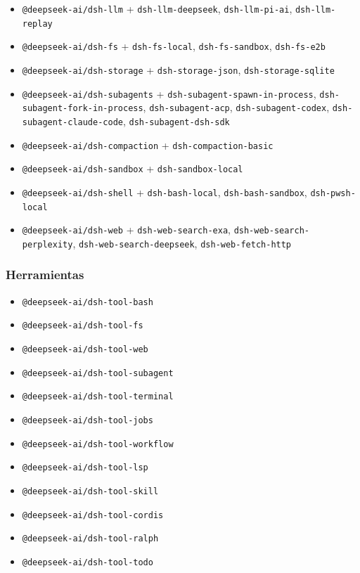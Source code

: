 \documentclass[11pt,a4paper]{article}
\begin{document}
\begin{itemize}[leftmargin=*,topsep=2pt,itemsep=1pt]
  \item \texttt{@deepseek-ai/dsh-llm} + \texttt{dsh-llm-deepseek}, \texttt{dsh-llm-pi-ai}, \texttt{dsh-llm-replay}
  \item \texttt{@deepseek-ai/dsh-fs} + \texttt{dsh-fs-local}, \texttt{dsh-fs-sandbox}, \texttt{dsh-fs-e2b}
  \item \texttt{@deepseek-ai/dsh-storage} + \texttt{dsh-storage-json}, \texttt{dsh-storage-sqlite}
  \item \texttt{@deepseek-ai/dsh-subagents} + \texttt{dsh-subagent-spawn-in-process}, \texttt{dsh-subagent-fork-in-process}, \texttt{dsh-subagent-acp}, \texttt{dsh-subagent-codex}, \texttt{dsh-subagent-claude-code}, \texttt{dsh-subagent-dsh-sdk}
  \item \texttt{@deepseek-ai/dsh-compaction} + \texttt{dsh-compaction-basic}
  \item \texttt{@deepseek-ai/dsh-sandbox} + \texttt{dsh-sandbox-local}
  \item \texttt{@deepseek-ai/dsh-shell} + \texttt{dsh-bash-local}, \texttt{dsh-bash-sandbox}, \texttt{dsh-pwsh-local}
  \item \texttt{@deepseek-ai/dsh-web} + \texttt{dsh-web-search-exa}, \texttt{dsh-web-search-perplexity}, \texttt{dsh-web-search-deepseek}, \texttt{dsh-web-fetch-http}
\end{itemize}


\subsubsection*{Herramientas}


\begin{itemize}[leftmargin=*,topsep=2pt,itemsep=1pt]
  \item \texttt{@deepseek-ai/dsh-tool-bash}
  \item \texttt{@deepseek-ai/dsh-tool-fs}
  \item \texttt{@deepseek-ai/dsh-tool-web}
  \item \texttt{@deepseek-ai/dsh-tool-subagent}
  \item \texttt{@deepseek-ai/dsh-tool-terminal}
  \item \texttt{@deepseek-ai/dsh-tool-jobs}
  \item \texttt{@deepseek-ai/dsh-tool-workflow}
  \item \texttt{@deepseek-ai/dsh-tool-lsp}
  \item \texttt{@deepseek-ai/dsh-tool-skill}
  \item \texttt{@deepseek-ai/dsh-tool-cordis}
  \item \texttt{@deepseek-ai/dsh-tool-ralph}
  \item \texttt{@deepseek-ai/dsh-tool-todo}
\end{itemize}
\end{document}
